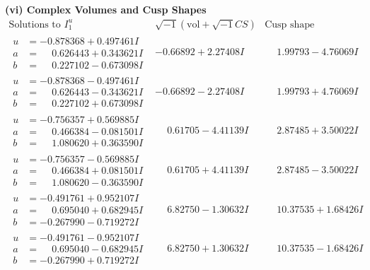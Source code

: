 \documentclass[1p]{elsarticle_modified}
\theoremstyle{definition}
\newcommand{\I}{\sqrt{-1}}
\begin{document}
\newpage\flushleft \textbf{(vi) Complex Volumes and Cusp Shapes}
$$\begin{array}{c|c|c}  
\text{Solutions to }I^u_{1}& \I (\text{vol} + \sqrt{-1}CS) & \text{Cusp shape}\\
 \hline 
\begin{aligned}
u &= -0.878368 + 0.497461 I \\
a &= \phantom{-}0.626443 + 0.343621 I \\
b &= \phantom{-}0.227102 - 0.673098 I\end{aligned}
 & -0.66892 + 2.27408 I & \phantom{-}1.99793 - 4.76069 I \\ \hline\begin{aligned}
u &= -0.878368 - 0.497461 I \\
a &= \phantom{-}0.626443 - 0.343621 I \\
b &= \phantom{-}0.227102 + 0.673098 I\end{aligned}
 & -0.66892 - 2.27408 I & \phantom{-}1.99793 + 4.76069 I \\ \hline\begin{aligned}
u &= -0.756357 + 0.569885 I \\
a &= \phantom{-}0.466384 - 0.081501 I \\
b &= \phantom{-}1.080620 + 0.363590 I\end{aligned}
 & \phantom{-}0.61705 - 4.41139 I & \phantom{-}2.87485 + 3.50022 I \\ \hline\begin{aligned}
u &= -0.756357 - 0.569885 I \\
a &= \phantom{-}0.466384 + 0.081501 I \\
b &= \phantom{-}1.080620 - 0.363590 I\end{aligned}
 & \phantom{-}0.61705 + 4.41139 I & \phantom{-}2.87485 - 3.50022 I \\ \hline\begin{aligned}
u &= -0.491761 + 0.952107 I \\
a &= \phantom{-}0.695040 + 0.682945 I \\
b &= -0.267990 - 0.719272 I\end{aligned}
 & \phantom{-}6.82750 - 1.30632 I & \phantom{-}10.37535 + 1.68426 I \\ \hline\begin{aligned}
u &= -0.491761 - 0.952107 I \\
a &= \phantom{-}0.695040 - 0.682945 I \\
b &= -0.267990 + 0.719272 I\end{aligned}
 & \phantom{-}6.82750 + 1.30632 I & \phantom{-}10.37535 - 1.68426 I \\ \hline\begin{aligned}

\end{aligned}
\end{array}$$
\end{document}
